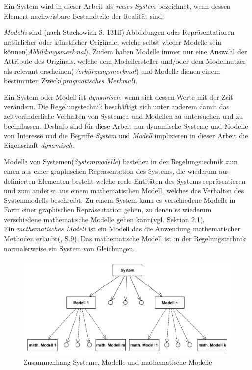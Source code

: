 Ein System wird in dieser Arbeit als \textit{reales System} bezeichnet, wenn dessen Element nachweisbare Bestandteile der Realität sind.

\textit{Modelle} sind (nach Stachowiak\cite{STA73} S. 131ff) Abbildungen oder Repräsentationen natürlicher oder künstlicher Originale, welche selbst wieder Modelle sein können(\textit{Abbildungsmerkmal}). Zudem haben Modelle immer nur eine Auswahl der Attribute des Originals, welche dem Modellersteller und/oder dem Modellnutzer als relevant erscheinen(\textit{Verkürzungsmerkmal}) und Modelle dienen einem bestimmten Zweck(\textit{pragmatisches Merkmal}). 

Ein System oder Modell ist \textit{dynamisch}, wenn sich dessen Werte mit der Zeit verändern. Die Regelungstechnik beschäftigt sich unter anderem damit das zeitveränderliche Verhalten von Systemen und Modellen zu untersuchen und zu beeinflussen. Deshalb sind für diese Arbeit nur dynamische Systeme und Modelle von Interesse und die Begriffe \textit{System} und \textit{Modell} implizieren in dieser Arbeit die Eigenschaft \textit{dynamisch}. 

Modelle von Systemen(\textit{Systemmodelle}) bestehen in der Regelungstechnik zum einen aus einer graphischen Repräsentation des Systems, die wiederum aus definierten Elementen besteht welche reale Entitäten des Systems repräsentieren und zum anderen aus einem mathematischen Modell, welches das Verhalten des Systemmodells beschreibt. Zu einem System kann es verschiedene Modelle in Form einer graphischen Repräsentation geben, zu denen es wiederum verschiedene mathematische Modelle geben kann(vgl. \cite{LUD95} Sektion 2.1).\\
Ein \textit{mathematisches Modell} ist ein Modell das die Anwendung mathematischer Methoden erlaubt(\cite{GRVO16}, S.9). Das mathematische Modell ist in der Regelungstechnik normalerweise ein System von Gleichungen. 

\begin{figure}[H]
	\centering
	\includegraphics[width=0.9\linewidth]{Systeme_Modelle_Math_Beschreibung}
	\caption{Zusammenhang Systeme, Modelle und mathematische Modelle}
	\label{fig:SysModelleSkizze}
\end{figure}


